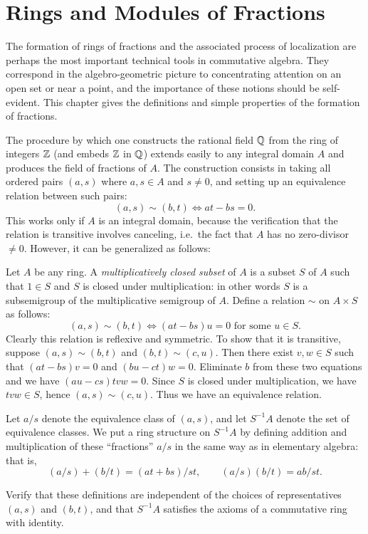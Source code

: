 \chapter{Rings and Modules of Fractions}\label{chapter3}

The formation of rings of fractions and the associated process of localization are perhaps the most important technical tools in commutative algebra. They correspond in the algebro-geometric picture to concentrating attention on an open set or near a point, and the importance of these notions should be self-evident. This chapter gives the definitions and simple properties of the formation of fractions.

The procedure by which one constructs the rational field $\mathbb{Q}$ from the ring of integers $\mathbb{Z}$ (and embeds $\mathbb{Z}$ in $\mathbb{Q}$) extends easily to any integral domain $A$ and produces the field of fractions of $A$. The construction consists in taking all ordered pairs $(a, s)$ where $a, s \in A$ and $s \neq 0$, and setting up an equivalence relation between such pairs:
\[
    (a, s) \sim (b, t) \iff at - bs = 0.
\]
This works only if $A$ is an integral domain, because the verification that the relation is transitive involves canceling, i.e.\ the fact that $A$ has no zero-divisor $\neq 0$. However, it can be generalized as follows:

Let $A$ be any ring. A \emph{multiplicatively closed subset} of $A$ is a subset $S$ of $A$ such that $1 \in S$ and $S$ is closed under multiplication: in other words $S$ is a subsemigroup of the multiplicative semigroup of $A$. Define a relation $\sim$ on $A \times S$ as follows:
\[
    (a, s) \sim (b, t) \iff (at - bs)u = 0 \text{ for some } u \in S.
\]
Clearly this relation is reflexive and symmetric. To show that it is transitive, suppose $(a, s) \sim (b, t)$ and $(b, t) \sim (c, u)$. Then there exist $v, w \in S$ such that $(at - bs)v = 0$ and $(bu - ct)w = 0$. Eliminate $b$ from these two equations and we have $(au - cs)tvw = 0$. Since $S$ is closed under multiplication, we have $tvw \in S$, hence $(a, s) \sim (c, u)$. Thus we have an equivalence relation.

Let $a/s$ denote the equivalence class of $(a, s)$, and let $S^{-1}A$ denote the set of equivalence classes. We put a ring structure on $S^{-1}A$ by defining addition and multiplication of these ``fractions'' $a/s$ in the same way as in elementary algebra: that is,
\[
    (a/s) + (b/t) = (at + bs)/st, \qquad (a/s)(b/t) = ab/st.
\]

\begin{exercise*}
    Verify that these definitions are independent of the choices of representatives $(a, s)$ and $(b, t)$, and that $S^{-1}A$ satisfies the axioms of a commutative ring with identity.
\end{exercise*}

